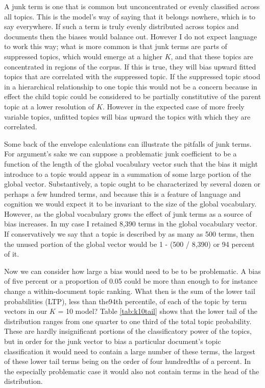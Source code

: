 \documentclass[]{book}
\theoremstyle{definition}
\theoremstyle{definition}
\theoremstyle{definition}
\theoremstyle{remark}
\begin{document}
A junk term is one that is common but unconcentrated or evenly
classified across all topics. This is the model's way of saying that it
belongs nowhere, which is to say everywhere. If such a term is truly
evenly distributed across topics and documents then the biases would
balance out. However I do not expect language to work this way; what is
more common is that junk terms are parts of suppressed topics, which
would emerge at a higher \(K\), and that these topics are concentrated
in regions of the corpus. If this is true, they will bias upward fitted
topics that are correlated with the suppressed topic. If the suppressed
topic stood in a hierarchical relationship to one topic this would not
be a concern because in effect the child topic could be considered to be
partially constitutive of the parent topic at a lower resolution of
\(K\). However in the expected case of more freely variable topics,
unfitted topics will bias upward the topics with which they are
correlated.

Some back of the envelope calculations can illustrate the pitfalls of
junk terms. For argument's sake we can suppose a problematic junk
coefficient to be a function of the length of the global vocabulary
vector such that the bias it might introduce to a topic would appear in
a summation of some large portion of the global vector. Substantively, a
topic ought to be characterized by several dozen or perhaps a few
hundred terms, and because this is a feature of language and cognition
we would expect it to be invariant to the size of the global vocabulary.
However, as the global vocabulary grows the effect of junk terms as a
source of bias increases. In my case I retained 8,390 terms in the
global vocabulary vector. If conservatively we say that a topic is
described by as many as 500 terms, then the unused portion of the global
vector would be 1 - (500 / 8,390) or 94 percent of it.

Now we can consider how large a bias would need to be to be problematic.
A bias of five percent or a proportion of 0.05 could be more than enough
to for instance change a within-document topic ranking. What then is the
sum of the lower tail probabilities (LTP), less than the94th percentile,
of each of the topic by term vectors in our \(K\) = 10 model? Table
\ref{tab:k10tail} shows that the lower tail of the distribution ranges
from one quarter to one third of the total topic probability. These are
hardly insignificant portions of the classificatory power of the topics,
but in order for the junk vector to bias a particular document's topic
classification it would need to contain a large number of these terms,
the largest of these lower tail terms being on the order of four
hundredths of a percent. In the especially problematic case it would
also not contain terms in the head of the distribution.
\end{document}
